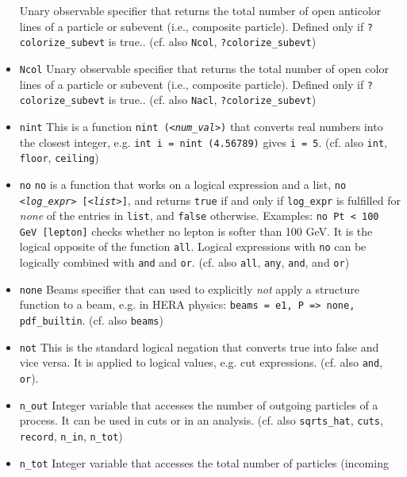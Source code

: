 \documentclass[12pt]{book}
\newcommand{\ttt}[1]{\texttt{#1}}
\begin{document}
\begin{itemize}
Unary observable specifier that returns the total number of open anticolor lines
of a particle or subevent (i.e., composite particle).  Defined only if
\ttt{?colorize\_subevt} is true.. (cf. also
\ttt{Ncol}, \ttt{?colorize\_subevt})
\item
\ttt{Ncol} \newline
Unary observable specifier that returns the total number of open color lines
of a particle or subevent (i.e., composite particle).  Defined only if
\ttt{?colorize\_subevt} is true.. (cf. also
\ttt{Nacl}, \ttt{?colorize\_subevt})
\item
\ttt{nint} \newline
This is a function \ttt{nint ({\em <num\_val>})} that converts real
numbers into the closest integer, e.g. \ttt{int i = nint (4.56789)}
gives \ttt{i = 5}. (cf. also
\ttt{int}, \ttt{floor}, \ttt{ceiling})
\item
\ttt{no} \newline
\ttt{no} is a function that works on a logical expression and a list,
\ttt{no {\em <log\_expr>} [{\em <list>}]}, and returns \ttt{true} if and only if
\ttt{log\_expr} is fulfilled for {\em none} of the entries in
\ttt{list}, and \ttt{false} otherwise. Examples: \ttt{no Pt < 100 GeV
  [lepton]} checks whether no lepton is softer than 100 GeV. It is the
logical opposite of the function \ttt{all}. Logical expressions with
\ttt{no} can be logically combined with \ttt{and} and
\ttt{or}. (cf. also \ttt{all}, \ttt{any}, \ttt{and}, and \ttt{or})
\item
\ttt{none} \newline
Beams specifier that can used to explicitly {\em not} apply a
structure function to a beam, e.g. in HERA physics: \ttt{beams = e1, P
  => none, pdf\_builtin}. (cf. also \ttt{beams})
\item
\ttt{not} \newline
This is the standard logical negation that converts true into false
and vice versa. It is applied to logical values, e.g. cut
expressions. (cf. also \ttt{and}, \ttt{or}).
\item
\ttt{n\_out} \newline
Integer variable that accesses the number of outgoing particles of a
process. It can be used in cuts or in an analysis. (cf. also
\ttt{sqrts\_hat}, \ttt{cuts}, \ttt{record}, \ttt{n\_in}, \ttt{n\_tot})
\item
\ttt{n\_tot} \newline
Integer variable that accesses the total number of particles (incoming

\end{itemize}
\end{document}
